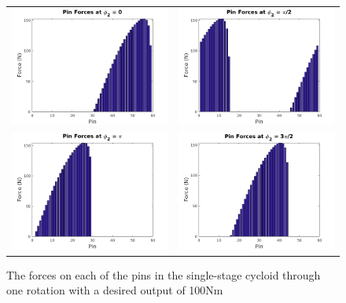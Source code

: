 \begin{figure}[!b]
   \centering
   \begin{tabular}{cc}
	   \includegraphics[width=0.48\linewidth]{fig/single_force_0} &
	   \includegraphics[width=0.48\linewidth]{fig/single_force_pi_2} \\
	   \includegraphics[width=0.48\linewidth]{fig/single_force_pi} &
	   \includegraphics[width=0.48\linewidth]{fig/single_force_3pi2}
   \end{tabular}
   \caption{The forces on each of the pins in the single-stage cycloid through one rotation with a desired output of 100Nm}
   \label{fig:single_forces}
\end{figure}

